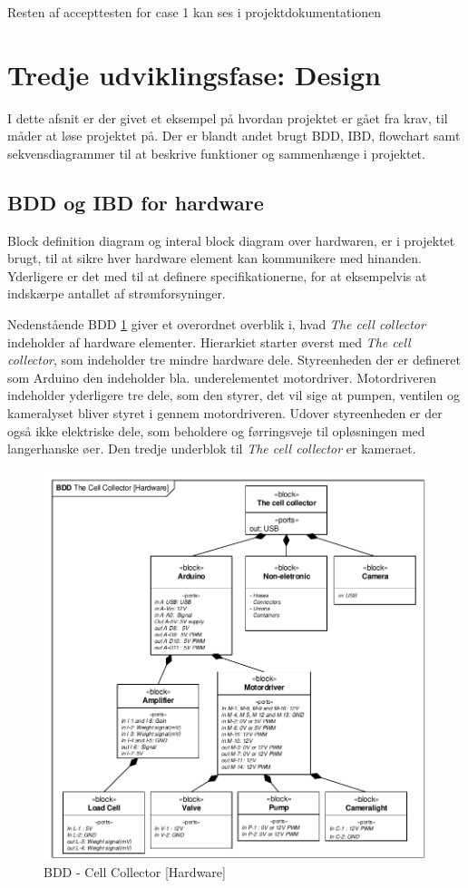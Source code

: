 Resten af accepttesten for case 1 kan ses i projektdokumentationen  

\section{Tredje udviklingsfase: Design}
\label{subsec:design}
I dette afsnit er der givet et eksempel på hvordan projektet er gået fra krav, til måder at løse projektet på. Der er blandt andet brugt BDD, IBD, flowchart samt sekvensdiagrammer til at beskrive funktioner og sammenhænge i projektet. 

\subsection{BDD og IBD for hardware}
Block definition diagram og interal block diagram over hardwaren, er i projektet brugt, til at sikre hver hardware element kan kommunikere med hinanden. Yderligere er det med til at definere specifikationerne, for at eksempelvis at indskærpe antallet af strømforsyninger.

Nedenstående BDD \ref{fig:bdd_Hardware} giver et overordnet overblik i, hvad \textit{The cell collector} indeholder af hardware elementer. Hierarkiet starter øverst med \textit{The cell collector}, som indeholder tre mindre hardware dele. Styreenheden der er defineret som Arduino den indeholder bla. underelementet motordriver. Motordriveren indeholder yderligere tre dele, som den styrer, det vil sige at pumpen, ventilen og kameralyset bliver styret i gennem motordriveren. Udover styreenheden er der også ikke elektriske dele, som beholdere og førringsveje til opløsningen med langerhanske øer. Den tredje underblok til \textit{The cell collector} er kameraet.

\begin{figure}[H]
	\centering
	\includegraphics[width=1\textwidth]{pdf/BDD_Hardware.pdf}
	\caption{BDD - Cell Collector [Hardware]}
	\label{fig:bdd_Hardware}
\end{figure}


